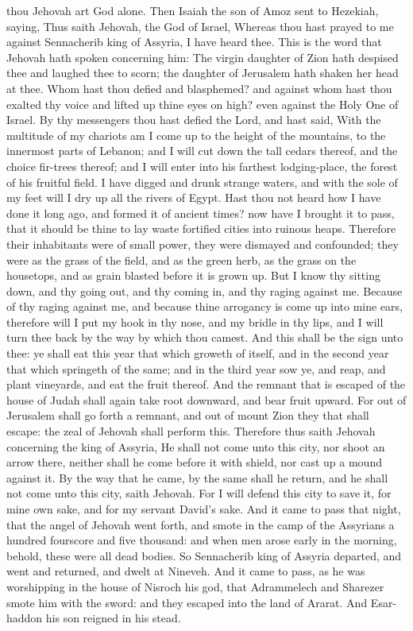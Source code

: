 thou Jehovah art God alone.  Then Isaiah the son of Amoz sent to Hezekiah, saying, Thus saith Jehovah, the God of Israel, Whereas thou hast prayed to me against Sennacherib king of Assyria, I have heard thee. This is the word that Jehovah hath spoken concerning him: The virgin daughter of Zion hath despised thee and laughed thee to scorn; the daughter of Jerusalem hath shaken her head at thee. Whom hast thou defied and blasphemed? and against whom hast thou exalted thy voice and lifted up thine eyes on high? even against the Holy One of Israel. By thy messengers thou hast defied the Lord, and hast said, With the multitude of my chariots am I come up to the height of the mountains, to the innermost parts of Lebanon; and I will cut down the tall cedars thereof, and the choice fir-trees thereof; and I will enter into his farthest lodging-place, the forest of his fruitful field. I have digged and drunk strange waters, and with the sole of my feet will I dry up all the rivers of Egypt.  Hast thou not heard how I have done it long ago, and formed it of ancient times? now have I brought it to pass, that it should be thine to lay waste fortified cities into ruinous heaps. Therefore their inhabitants were of small power, they were dismayed and confounded; they were as the grass of the field, and as the green herb, as the grass on the housetops, and as grain blasted before it is grown up. But I know thy sitting down, and thy going out, and thy coming in, and thy raging against me. Because of thy raging against me, and because thine arrogancy is come up into mine ears, therefore will I put my hook in thy nose, and my bridle in thy lips, and I will turn thee back by the way by which thou camest.  And this shall be the sign unto thee: ye shall eat this year that which groweth of itself, and in the second year that which springeth of the same; and in the third year sow ye, and reap, and plant vineyards, and eat the fruit thereof. And the remnant that is escaped of the house of Judah shall again take root downward, and bear fruit upward. For out of Jerusalem shall go forth a remnant, and out of mount Zion they that shall escape: the zeal of Jehovah shall perform this. Therefore thus saith Jehovah concerning the king of Assyria, He shall not come unto this city, nor shoot an arrow there, neither shall he come before it with shield, nor cast up a mound against it. By the way that he came, by the same shall he return, and he shall not come unto this city, saith Jehovah. For I will defend this city to save it, for mine own sake, and for my servant David’s sake.  And it came to pass that night, that the angel of Jehovah went forth, and smote in the camp of the Assyrians a hundred fourscore and five thousand: and when men arose early in the morning, behold, these were all dead bodies. So Sennacherib king of Assyria departed, and went and returned, and dwelt at Nineveh. And it came to pass, as he was worshipping in the house of Nisroch his god, that Adrammelech and Sharezer smote him with the sword: and they escaped into the land of Ararat. And Esar-haddon his son reigned in his stead. 

